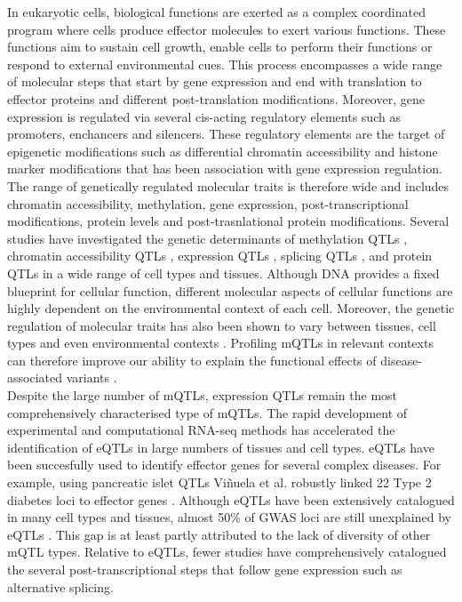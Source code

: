 In eukaryotic cells, biological functions are exerted as a complex coordinated program where cells produce effector molecules to exert various functions. These functions aim to sustain cell growth, enable cells to perform their functions or respond to external environmental cues. This process encompasses a wide range of molecular steps that start by gene expression and end with translation to effector proteins and different post-translation modifications. Moreover, gene expression is regulated via several cis-acting regulatory elements such as promoters, enchancers and silencers. These regulatory elements are the target of epigenetic modifications such as differential chromatin accessibility and histone marker modifications that has been association with gene expression regulation. The range of genetically regulated molecular traits is therefore wide and includes chromatin accessibility, methylation, gene expression, post-transcriptional modifications, protein levels and post-trasnlational protein modifications. Several studies have investigated the genetic determinants of methylation QTLs \cite{Oliva2023-nt,Hannon2016-mt,Morrow2018-fv,Taylor2019-tm,Huan2019-ke,Andrews2017-os}, chromatin accessibility QTLs \cite{Alasoo2018-pv,Currin2021-kp}, expression QTLs \cite{The_GTEx_Consortium2020-gg,Vosa2021-pb,Kerimov2021-gh}, splicing QTLs \cite{The_GTEx_Consortium2020-gg,Qi2022-iz}, and protein QTLs \cite{Yao2018-oy,Sun2018-uy} in a wide range of cell types and tissues. Although DNA provides a fixed blueprint for cellular function, different molecular aspects of cellular functions are highly dependent on the environmental context of each cell. Moreover, the genetic regulation of molecular traits has also been shown to vary between tissues, cell types and even environmental contexts \cite{Zhernakova2017-uo,Mu2021-ar}. Profiling mQTLs in relevant contexts can therefore improve our ability to explain the functional effects of disease-associated variants \cite{Ongen2017-cd}.\\

Despite the large number of mQTLs, expression QTLs remain the most comprehensively characterised type of mQTLs. The rapid development of experimental and computational RNA-seq methods has accelerated the identification of eQTLs in large numbers of tissues and cell types. eQTLs have been succesfully used to identify effector genes for several complex diseases. For example, using pancreatic islet QTLs Viñuela et al. robustly linked 22 Type 2 diabetes loci to effector genes \cite{Vinuela2020-ce}. Although eQTLs have been extensively catalogued in many cell types and tissues, almost 50\% of GWAS loci are still unexplained by eQTLs \cite{Mountjoy2021-fc}. This gap is at least partly attributed to the lack of diversity of other mQTL types. Relative to eQTLs, fewer studies have comprehensively catalogued the several post-transcriptional steps that follow gene expression such as alternative splicing.\\

